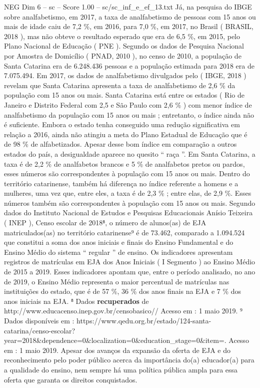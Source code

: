 \begin{textsample}{NEG Dim 6 – sc – Score 1.00 – sc/sc\_inf\_e\_ef\_13.txt}
Já, na pesquisa do IBGE sobre analfabetismo, em 2017, a taxa de analfabetismo de pessoas com 15 anos ou mais de idade caiu de 7,2 \%, em 2016, para 7,0 \%, em 2017, no Brasil ( BRASIL, 2018 ), mas não obteve o resultado esperado que era de 6,5 \%, em 2015, pelo Plano Nacional de Educação ( PNE ).
Segundo os dados de Pesquisa Nacional por Amostra de Domicílio ( PNAD, 2010 ), no censo de 2010, a população de Santa Catarina era de 6.248.436 pessoas e a população estimada para 2018 era de 7.075.494.
Em 2017, os dados de analfabetismo divulgados pelo ( IBGE, 2018 ) revelam que Santa Catarina apresenta a taxa de analfabetismo de 2,6 \% da população com 15 anos ou mais.
Santa Catarina está entre os estados ( Rio de Janeiro e Distrito Federal com 2,5 e São Paulo com 2,6 \% ) com menor índice de analfabetismo da população com 15 anos ou mais ; entretanto, o índice ainda não é suficiente.
Embora o estado tenha conseguido uma redução significativa em relação a 2016, ainda não atingiu a meta do Plano Estadual de Educação que é de 98 \% de alfabetizados.
Apesar desse bom índice em comparação a outros estados do país, a desigualdade aparece no quesito “ raça ”.
Em Santa Catarina, a taxa é de 2,2 \% de analfabetos brancos e 5 \% de analfabetos pretos ou pardos, esses números são correspondentes à população com 15 anos ou mais.
Dentro do território catarinense, também há diferença no índice referente a homens e a mulheres, uma vez que, entre eles, a taxa é de 2,3 \% ; entre elas, de 2,9 \%.
Esses números também são correspondentes à população com 15 anos ou mais.
Segundo dados do Instituto Nacional de Estudos e Pesquisas Educacionais Anísio Teixeira ( INEP ), Censo escolar de 2018⁸, o número de alunos(as) de EJA matriculados(as) no território catarinense⁹ é de 73.462, comparado a 1.094.524 que constitui a soma dos anos iniciais e finais do Ensino Fundamental e do Ensino Médio do sistema “ regular ” de ensino.
Os indicadores apresentam registros de matrículas em EJA dos Anos Iniciais ( I Segmento ) ao Ensino Médio de 2015 a 2019.
Esses indicadores apontam que, entre o período analisado, no ano de 2019, o Ensino Médio representa o maior percentual de matrículas nas instituições do estado, que é de 57 \%, 36 \% dos anos finais na EJA e 7 \% dos anos iniciais na EJA. ⁸ Dados \textbf{recuperados} de http://www.educacenso.inep.gov.br/censobasico// Acesso em : 1 maio 2019. ⁹ Dados disponíveis em : https://www.qedu.org.br/estado/124-santa-catarina/censo-escolar? year=2018\&dependence=0\&localization=0\&education\_stage=0\&item=.
Acesso em : 1 maio 2019.
Apesar dos avanços da expansão da oferta de EJA e do reconhecimento pelo poder público acerca da importância do(a) educador(a) para a qualidade do ensino, nem sempre há uma política pública ampla para essa oferta que garanta os direitos conquistados.

\end{textsample}
